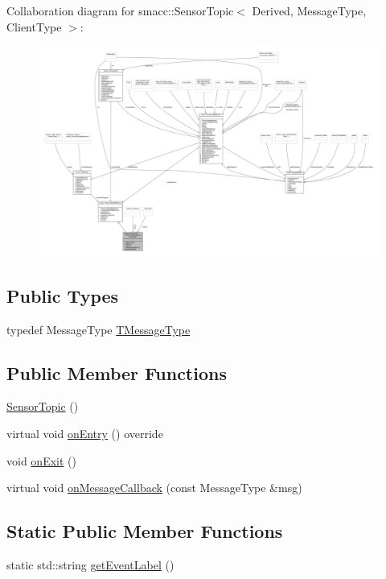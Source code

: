 Collaboration diagram for smacc\+:\+:Sensor\+Topic$<$ Derived, Message\+Type, Client\+Type $>$\+:
\nopagebreak
\begin{figure}[H]
\begin{center}
\leavevmode
\includegraphics[width=350pt]{classsmacc_1_1SensorTopic__coll__graph}
\end{center}
\end{figure}
\subsection*{Public Types}
\begin{DoxyCompactItemize}
\item 
typedef Message\+Type \hyperlink{classsmacc_1_1SensorTopic_adbe35371b4599a2705deeb76a11cb1ea}{T\+Message\+Type}
\end{DoxyCompactItemize}
\subsection*{Public Member Functions}
\begin{DoxyCompactItemize}
\item 
\hyperlink{classsmacc_1_1SensorTopic_ac215722d9003b7c45554d6963cc39c07}{Sensor\+Topic} ()
\item 
virtual void \hyperlink{classsmacc_1_1SensorTopic_a9c196c5c73faffcaffba3f8934bae191}{on\+Entry} () override
\item 
void \hyperlink{classsmacc_1_1SensorTopic_a07256412cede49676b38cfd5b5aa1ce3}{on\+Exit} ()
\item 
virtual void \hyperlink{classsmacc_1_1SensorTopic_abf9e11f5097d4581818e045738bec552}{on\+Message\+Callback} (const Message\+Type \&msg)
\end{DoxyCompactItemize}
\subsection*{Static Public Member Functions}
\begin{DoxyCompactItemize}
\item 
static std\+::string \hyperlink{classsmacc_1_1SensorTopic_a67bfe4ce61a385b4b5b734af9314b7b0}{get\+Event\+Label} ()
\end{DoxyCompactItemize}
